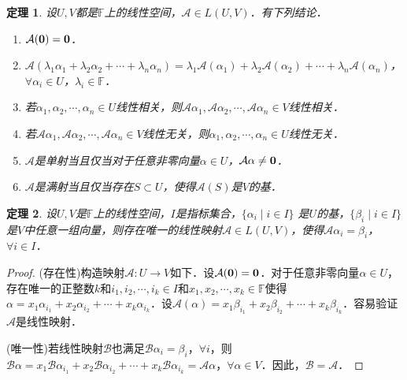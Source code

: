 \documentclass[a4paper,fontset=windows]{ctexbook}
\newtheorem{theorem}{定理}[chapter]
\theoremstyle{definition}
\begin{document}
\begin{theorem}\label{thm9.1}
设$U,V$都是$\mathbb{F}$上的线性空间，$\mathcal{A}\in L(U,V)$．有下列结论．
\begin{enumerate}
\item $\mathcal{A}({\bf 0})={\bf 0}$．

\item $\mathcal{A}(\lambda_1\alpha_1+\lambda_2\alpha_2+\cdots+\lambda_n\alpha_n)=\lambda_1\mathcal{A}(\alpha_1)+\lambda_2\mathcal{A}(\alpha_2)+\cdots+\lambda_n\mathcal{A}(\alpha_n)$，$\forall\alpha_i\in U$，$\lambda_i\in\mathbb{F}$．

\item 若$\alpha_1,\alpha_2,\cdots,\alpha_n\in U$线性相关，则$\mathcal{A}\alpha_1,\mathcal{A}\alpha_2,\cdots,\mathcal{A}\alpha_n\in V$线性相关．

\item 若$\mathcal{A}\alpha_1,\mathcal{A}\alpha_2,\cdots,\mathcal{A}\alpha_n\in V$线性无关，则$\alpha_1,\alpha_2,\cdots,\alpha_n\in U$线性无关．

\item $\mathcal{A}$是单射当且仅当对于任意非零向量$\alpha\in U$，$\mathcal{A}\alpha\ne{\bf 0}$．

\item $\mathcal{A}$是满射当且仅当存在$S\subset U$，使得$\mathcal{A}(S)$是$V$的基．
\end{enumerate}
\end{theorem}

\begin{theorem}\label{thm9.2}
设$U,V$是$\mathbb{F}$上的线性空间，$I$是指标集合，$\{\alpha_i\mid i\in I\}$ 是$U$的基，$\{\beta_i\mid i\in I\}$是$V$中任意一组向量，则存在唯一的线性映射$\mathcal{A}\in L(U,V)$，使得$\mathcal{A}\alpha_i=\beta_i$，$\forall i\in I$．
\end{theorem}

\begin{proof}
(存在性)构造映射$\mathcal{A}:U\to V$如下．设$\mathcal{A}({\bf 0})={\bf 0}$．对于任意非零向量$\alpha\in U$，存在唯一的正整数$k$和$i_1,i_2,\cdots,i_k\in I$和$x_1,x_2,\cdots,x_k\in\mathbb{F}$使得$\alpha=x_1\alpha_{i_1}+x_2\alpha_{i_2}+\cdots+x_k\alpha_{i_k}$．设$\mathcal{A}(\alpha)=x_1\beta_{i_1}+x_2\beta_{i_2}+\cdots+x_k\beta_{i_k}$．容易验证$\mathcal{A}$是线性映射．

(唯一性)若线性映射$\mathcal{B}$也满足$\mathcal{B}\alpha_i=\beta_i$，$\forall i$，则$\mathcal{B}\alpha=x_1\mathcal{B}\alpha_{i_1}+x_2\mathcal{B}\alpha_{i_2}+\cdots+x_k\mathcal{B}\alpha_{i_k}=\mathcal{A}\alpha$，$\forall\alpha\in V$．因此，$\mathcal{B=A}$．
\end{proof}
\end{document}
